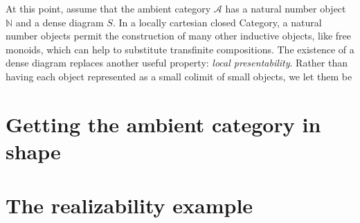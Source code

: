 \documentclass{tac}
\newcommand\hide[1]{}
\newcommand\cat\mathcal
\newcommand\nno{\mathbb N}
\begin{document}
At this point, assume that the ambient category $\cat A$ has a natural number object $\nno$ and a dense diagram $S$. In a locally cartesian closed Category, a natural number objects permit the construction of many other inductive objects, like free monoids, which can help to substitute transfinite compositions. The existence of a dense diagram replaces another useful property: \emph{local presentability}. Rather than having each object represented as a small colimit of small objects, we let them be 










\hide{the difficulty is going to be showing that the construction delivers a presaturated diagram and that may show presaturated diagram to be useless abstractions.}





\section{Getting the ambient category in shape}
\hide{
- nno's cycles & horns
- W-types
-	etc.
}

\section{The realizability example}
\hide{
- simplicial assemblies & modest sets.
- exact completions for pushouts.
- exact completions as examples of homotopy categories.
}
\end{document}
